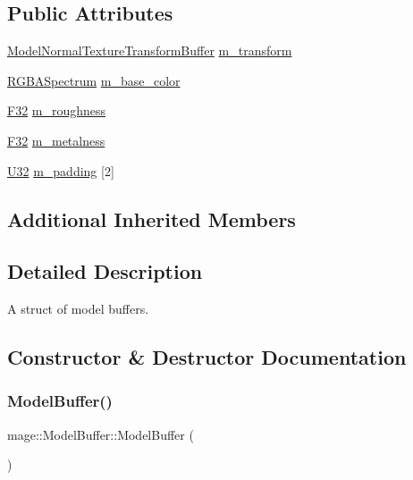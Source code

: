 \subsection*{Public Attributes}
\begin{DoxyCompactItemize}
\item 
\hyperlink{structmage_1_1_model_normal_texture_transform_buffer}{Model\+Normal\+Texture\+Transform\+Buffer} \hyperlink{structmage_1_1_model_buffer_adb77c7da1573f0d94665b73ea1887420}{m\+\_\+transform}
\item 
\hyperlink{structmage_1_1_r_g_b_a_spectrum}{R\+G\+B\+A\+Spectrum} \hyperlink{structmage_1_1_model_buffer_ad7cb4d795043cb92dad61e3aa0c4b2a2}{m\+\_\+base\+\_\+color}
\item 
\hyperlink{namespacemage_aa97e833b45f06d60a0a9c4fc22ae02c0}{F32} \hyperlink{structmage_1_1_model_buffer_a33adb9ff193fcccf618bf6ceb7b1a31e}{m\+\_\+roughness}
\item 
\hyperlink{namespacemage_aa97e833b45f06d60a0a9c4fc22ae02c0}{F32} \hyperlink{structmage_1_1_model_buffer_a1be491fffd79c3e5d37d066f0ef9ab96}{m\+\_\+metalness}
\item 
\hyperlink{namespacemage_a41c104c036fba3756a74e19f793eeaa1}{U32} \hyperlink{structmage_1_1_model_buffer_a11ae104f8ba32afbd910a2f18d04d352}{m\+\_\+padding} \mbox{[}2\mbox{]}
\end{DoxyCompactItemize}
\subsection*{Additional Inherited Members}


\subsection{Detailed Description}
A struct of model buffers. 

\subsection{Constructor \& Destructor Documentation}
\hypertarget{structmage_1_1_model_buffer_a9069cfb6d75067b7f1509332fbec9be0}{}\label{structmage_1_1_model_buffer_a9069cfb6d75067b7f1509332fbec9be0} 
\subsubsection{\texorpdfstring{Model\+Buffer()}{ModelBuffer()}\hspace{0.1cm}{\footnotesize\ttfamily [1/3]}}
{\footnotesize\ttfamily mage\+::\+Model\+Buffer\+::\+Model\+Buffer (\begin{DoxyParamCaption}{ }\end{DoxyParamCaption})}

